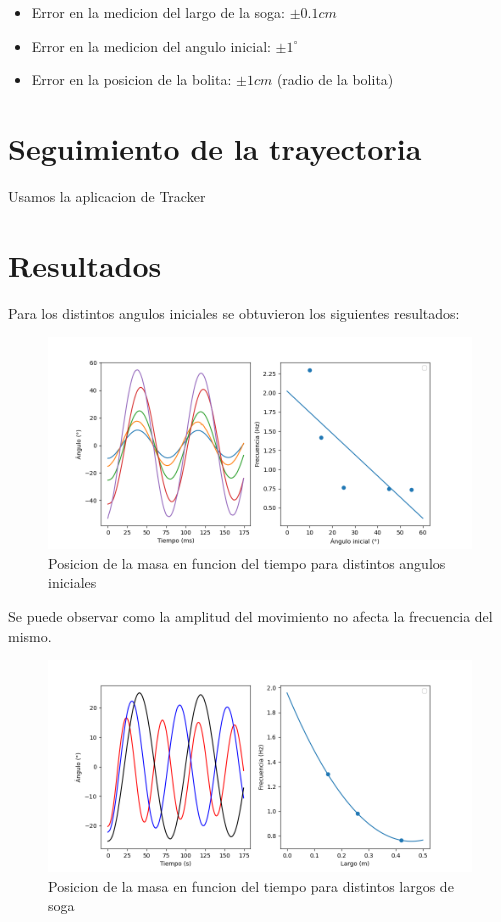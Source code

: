 \documentclass[12pt,a4]{article}
\begin{document}
\begin{itemize}
    \item Error en la medicion del largo de la soga: $\pm 0.1 cm$
    \item Error en la medicion del angulo inicial: $\pm 1^\circ$
    \item Error en la posicion de la bolita: $\pm 1 cm$ (radio de la bolita)
\end{itemize}

\section{Seguimiento de la trayectoria}

Usamos la aplicacion de Tracker %

\section{Resultados}

Para los distintos angulos iniciales se obtuvieron los siguientes resultados:

\begin{figure}[H]
    \centering
    \includegraphics[width=0.6\linewidth]{angulos.png}
    \caption{Posicion de la masa en funcion del tiempo para distintos angulos iniciales}
    \label{fig:angulos}
\end{figure}

Se puede observar como la amplitud del movimiento no afecta la frecuencia del mismo. 

\begin{figure}[H]
    \centering
    \includegraphics[width=0.6\linewidth]{largo.png}
    \caption{Posicion de la masa en funcion del tiempo para distintos largos de soga}
    \label{fig:largo}
\end{figure}
\end{document}
